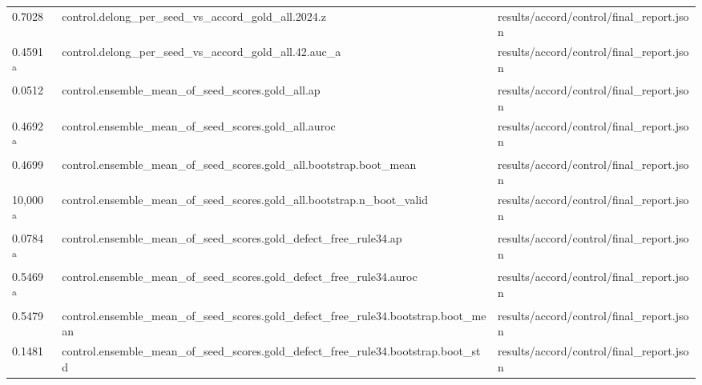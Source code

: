 \begin{longtable}{@{}p{0.7in}p{1.9in}p{2.6in}@{}}
0.7028 & control.\allowbreak{}delong\_per\_seed\_vs\_accord\_gold\_all.\allowbreak{}2024.\allowbreak{}z & results/\allowbreak{}accord/\allowbreak{}control/\allowbreak{}final\_report.\allowbreak{}json\\
0.4591 \textsuperscript{a} & control.\allowbreak{}delong\_per\_seed\_vs\_accord\_gold\_all.\allowbreak{}42.\allowbreak{}auc\_a & results/\allowbreak{}accord/\allowbreak{}control/\allowbreak{}final\_report.\allowbreak{}json\\
0.0512 & control.\allowbreak{}ensemble\_mean\_of\_seed\_scores.\allowbreak{}gold\_all.\allowbreak{}ap & results/\allowbreak{}accord/\allowbreak{}control/\allowbreak{}final\_report.\allowbreak{}json\\
0.4692 \textsuperscript{a} & control.\allowbreak{}ensemble\_mean\_of\_seed\_scores.\allowbreak{}gold\_all.\allowbreak{}auroc & results/\allowbreak{}accord/\allowbreak{}control/\allowbreak{}final\_report.\allowbreak{}json\\
0.4699 & control.\allowbreak{}ensemble\_mean\_of\_seed\_scores.\allowbreak{}gold\_all.\allowbreak{}bootstrap.\allowbreak{}boot\_mean & results/\allowbreak{}accord/\allowbreak{}control/\allowbreak{}final\_report.\allowbreak{}json\\
10,000 \textsuperscript{a} & control.\allowbreak{}ensemble\_mean\_of\_seed\_scores.\allowbreak{}gold\_all.\allowbreak{}bootstrap.\allowbreak{}n\_boot\_valid & results/\allowbreak{}accord/\allowbreak{}control/\allowbreak{}final\_report.\allowbreak{}json\\
0.0784 \textsuperscript{a} & control.\allowbreak{}ensemble\_mean\_of\_seed\_scores.\allowbreak{}gold\_defect\_free\_rule34.\allowbreak{}ap & results/\allowbreak{}accord/\allowbreak{}control/\allowbreak{}final\_report.\allowbreak{}json\\
0.5469 \textsuperscript{a} & control.\allowbreak{}ensemble\_mean\_of\_seed\_scores.\allowbreak{}gold\_defect\_free\_rule34.\allowbreak{}auroc & results/\allowbreak{}accord/\allowbreak{}control/\allowbreak{}final\_report.\allowbreak{}json\\
0.5479 & control.\allowbreak{}ensemble\_mean\_of\_seed\_scores.\allowbreak{}gold\_defect\_free\_rule34.\allowbreak{}bootstrap.\allowbreak{}boot\_mean & results/\allowbreak{}accord/\allowbreak{}control/\allowbreak{}final\_report.\allowbreak{}json\\
0.1481 & control.\allowbreak{}ensemble\_mean\_of\_seed\_scores.\allowbreak{}gold\_defect\_free\_rule34.\allowbreak{}bootstrap.\allowbreak{}boot\_std & results/\allowbreak{}accord/\allowbreak{}control/\allowbreak{}final\_report.\allowbreak{}json\\

\end{longtable}
